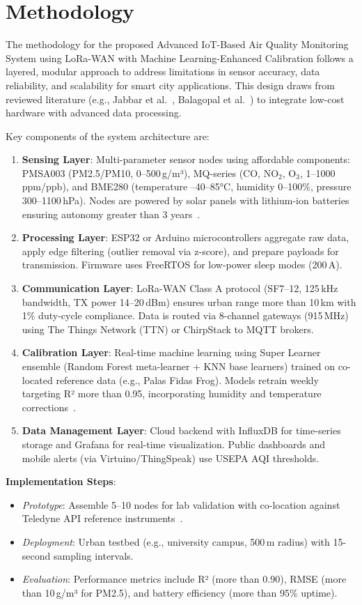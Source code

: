 \documentclass[conference]{IEEEtran}
\begin{document}
\section{Methodology}
The methodology for the proposed Advanced IoT-Based Air Quality Monitoring System using LoRa-WAN with Machine Learning-Enhanced Calibration follows a layered, modular approach to address limitations in sensor accuracy, data reliability, and scalability for smart city applications. This design draws from reviewed literature (e.g., Jabbar et al.~\cite{jabbar2022}, Balagopal et al.~\cite{balagopal2025}) to integrate low-cost hardware with advanced data processing.

Key components of the system architecture are:
\begin{enumerate}
    \item \textbf{Sensing Layer}: Multi-parameter sensor nodes using affordable components: PMSA003 (PM2.5/PM10, 0--500\,\textmu g/m³), MQ-series (CO, NO$_2$, O$_3$, 1--1000\,ppm/ppb), and BME280 (temperature --40--85°C, humidity 0--100\%, pressure 300--1100\,hPa). Nodes are powered by solar panels with lithium-ion batteries ensuring autonomy greater than 3 years~\cite{sulimat2024}.
    \item \textbf{Processing Layer}: ESP32 or Arduino microcontrollers aggregate raw data, apply edge filtering (outlier removal via z-score), and prepare payloads for transmission. Firmware uses FreeRTOS for low-power sleep modes (200\,\textmu A).
    \item \textbf{Communication Layer}: LoRa-WAN Class A protocol (SF7--12, 125\,kHz bandwidth, TX power 14--20\,dBm) ensures urban range more than 10\,km with 1\% duty-cycle compliance. Data is routed via 8-channel gateways (915\,MHz) using The Things Network (TTN) or ChirpStack to MQTT brokers.
    \item \textbf{Calibration Layer}: Real-time machine learning using Super Learner ensemble (Random Forest meta-learner + KNN base learners) trained on co-located reference data (e.g., Palas Fidas Frog). Models retrain weekly targeting R² more than 0.95, incorporating humidity and temperature corrections~\cite{balagopal2025}.
    \item \textbf{Data Management Layer}: Cloud backend with InfluxDB for time-series storage and Grafana for real-time visualization. Public dashboards and mobile alerts (via Virtuino/ThingSpeak) use USEPA AQI thresholds.
\end{enumerate}

\textbf{Implementation Steps}:
\begin{itemize}
    \item \textit{Prototype}: Assemble 5--10 nodes for lab validation with co-location against Teledyne API reference instruments~\cite{glass2020}.
    \item \textit{Deployment}: Urban testbed (e.g., university campus, 500\,m radius) with 15-second sampling intervals.
    \item \textit{Evaluation}: Performance metrics include R² (more than 0.90), RMSE (more than 10\,\textmu g/m³ for PM2.5), and battery efficiency (more than 95\% uptime).
\end{itemize}
\end{document}
